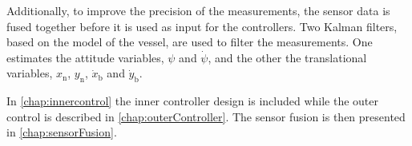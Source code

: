 Additionally, to improve the precision of the measurements, the sensor data is fused together before it is used as input for the controllers. Two Kalman filters, based on the model of the vessel, are used to filter the measurements. One estimates the attitude variables, $\psi$ and $\dot{\psi}$, and the other the translational variables, $x_\mathrm{n}$, $y_\mathrm{n}$, $\dot{x}_\mathrm{b}$ and $\dot{y}_\mathrm{b}$.

In \autoref{chap:innercontrol} the inner controller design is included while the outer control is described in \autoref{chap:outerController}. The sensor fusion is then presented in \autoref{chap:sensorFusion}.

